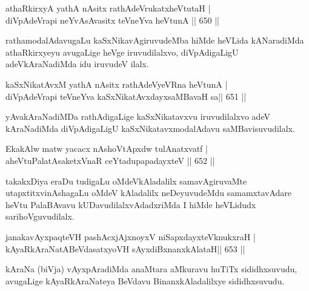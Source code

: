 
\begin{shl}
athaRkirxyA yathA nAsitx rathAdeVrukatxheVtutaH | \\
diVpAdeVrapi neYvAsAvasitx teVneYva heVtunA \hfill||  650 ||  
\end{shl}

\begin{artha}
rathamodalAdavugaLu kaSxNikavAgiruvudeMba hiMde heVLida kANaradiMda athaR\-kirxyeyu avugaLige heVge iruvudilalxvo, diVpAdigaLigU adeVkAraNadiMda idu iruvudeV ilalx.
\end{artha}

\begin{shl}
kaSxNikatAvxM yathA nAsitx rathAdeVyeVRna heVtunA | \\
diVpAdeVrapi teVneYva kaSxNikatAvxdayxsaMBavaH sa\hfill ||  651 ||  
\end{shl}

\begin{artha}
yAvakAraNadiMDa rathAdigaLige kaSxNikatavxvu iruvudilalxvo adeV kAraNadiMda diVpAdigaLigU kaSxNikatavxmodalAdavu saMBavisuvudilalx.
\end{artha}

\begin{shl}
EkakAlw matw yacacx nAshoVtApxdw tulAnatxvatf | \\
aheVtuPalatAsaketxVnaR ceYtadupapadayxteV \hfill||  652 ||  
\end{shl}

\begin{artha}
takakxDiya eraDu tudigaLu oMdeVkAladalilx samavAgiruvaMte utapxtitxvinAshagaLu oMdeV kAladalilx neDeyuvudeMdu samamxtavAdare heVtu PalaBAvavu kUDavudilalxvAdadxriMda I hiMde heVLidudx sarihoVguvudilalx.
\end{artha}


\begin{shl}
janakavAyxpaqteVH pashAcxjAjxnoyxV niSapxdayxteV\s knukxraH | \\
kAyaRkAraNatABeVdasatxyoVH sAyxdiBxnanxkAlataH\hfill ||  653 ||  
\end{shl}

\begin{artha}
kAraNa (biVja) vAyxpAradiMda anaMtara aMkuravu huTiTx sididhxsuvudu, avugaLige kAyaRkAraNateya BeVdavu BinanxkAladalilxye sididhxsuvudu.
\end{artha}


